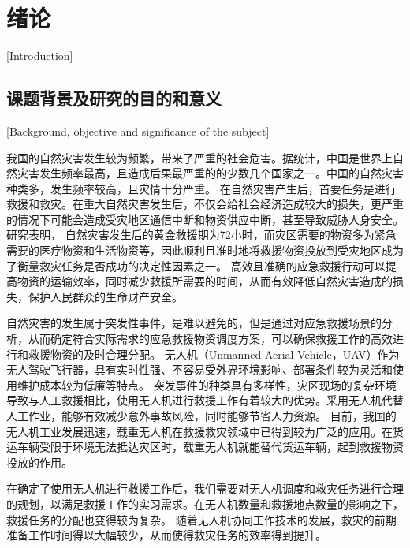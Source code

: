 
\chapter{绪论}[Introduction]

\section{课题背景及研究的目的和意义}[Background, objective and significance of the subject]

我国的自然灾害发生较为频繁，带来了严重的社会危害。据统计，中国是世界上自然灾害发生频率最高，且造成后果最严重的的少数几个国家之一。中国的自然灾害种类多，发生频率较高，且灾情十分严重。
在自然灾害产生后，首要任务是进行救援和救灾。在重大自然灾害发生后，不仅会给社会经济造成较大的损失，更严重的情况下可能会造成受灾地区通信中断和物资供应中断，甚至导致威胁人身安全。研究表明，
自然灾害发生后的黄金救援期为72小时，而灾区需要的物资多为紧急需要的医疗物资和生活物资等，因此顺利且准时地将救援物资投放到受灾地区成为了衡量救灾任务是否成功的决定性因素之一。
高效且准确的应急救援行动可以提高物资的运输效率，同时减少救援所需要的时间，从而有效降低自然灾害造成的损失，保护人民群众的生命财产安全。


自然灾害的发生属于突发性事件，是难以避免的，但是通过对应急救援场景的分析，从而确定符合实际需求的应急救援物资调度方案，可以确保救援工作的高效进行和救援物资的及时合理分配。
无人机（Unmanned Aerial Vehicle，UAV）作为无人驾驶飞行器，具有实时性强、不容易受外界环境影响、部署条件较为灵活和使用维护成本较为低廉等特点。
突发事件的种类具有多样性，灾区现场的复杂环境导致与人工救援相比，使用无人机进行救援工作有着较大的优势。采用无人机代替人工作业，能够有效减少意外事故风险，同时能够节省人力资源。
目前，我国的无人机工业发展迅速，载重无人机在救援救灾领域中已得到较为广泛的应用。在货运车辆受限于环境无法抵达灾区时，载重无人机就能替代货运车辆，起到救援物资投放的作用。


在确定了使用无人机进行救援工作后，我们需要对无人机调度和救灾任务进行合理的规划，以满足救援工作的实习需求。在无人机数量和救援地点数量的影响之下，救援任务的分配也变得较为复杂。
随着无人机协同工作技术的发展，救灾的前期准备工作时间得以大幅较少，从而使得救灾任务的效率得到提升。


